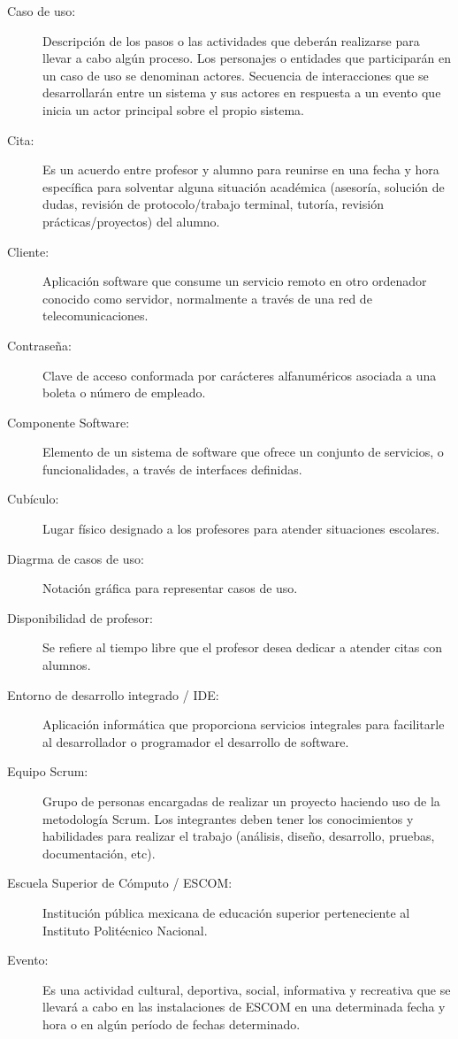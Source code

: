 \begin{description}
	\item[Caso de uso:] Descripción de los pasos o las actividades que deberán realizarse para llevar a cabo algún proceso. Los personajes o entidades que participarán en un caso de uso se denominan actores. Secuencia de interacciones que se desarrollarán entre un sistema y sus actores en respuesta a un evento que inicia un actor principal sobre el propio sistema.
	\item[Cita:] Es un acuerdo entre profesor y alumno para reunirse en una fecha y hora específica para solventar alguna situación académica (asesoría, solución de dudas, revisión de protocolo/trabajo terminal, tutoría, revisión prácticas/proyectos) del alumno.
	\item[Cliente:] Aplicación software que consume un servicio remoto en otro ordenador conocido como servidor, normalmente a través de una red de telecomunicaciones.
	\item[Contraseña:] Clave de acceso conformada por carácteres alfanuméricos asociada a una boleta o número de empleado.
	\item[Componente Software:] Elemento de un sistema de software que ofrece un conjunto de servicios, o funcionalidades, a través de interfaces definidas.
	\item[Cubículo:] Lugar físico designado a los profesores para atender situaciones escolares.

	\item[Diagrma de casos de uso:] Notación gráfica para representar casos de uso.
	\item[Disponibilidad de profesor:] Se refiere al tiempo libre que el profesor desea dedicar a atender citas con alumnos.
	
	\item[Entorno de desarrollo integrado / IDE:] Aplicación informática que proporciona servicios integrales para facilitarle al desarrollador o programador el desarrollo de software.
	\item[Equipo Scrum:] Grupo de personas encargadas de realizar un proyecto haciendo uso de la metodología Scrum. Los integrantes deben tener los conocimientos y habilidades para realizar el trabajo (análisis, diseño, desarrollo, pruebas, documentación, etc).
	\item[Escuela Superior de Cómputo / ESCOM:] Institución pública mexicana de educación superior perteneciente al Instituto Politécnico Nacional.
	\item[Evento:] Es una actividad cultural, deportiva, social, informativa y recreativa que se llevará a cabo en las instalaciones de ESCOM en una determinada fecha y hora o en algún período de fechas determinado.


\end{description}
